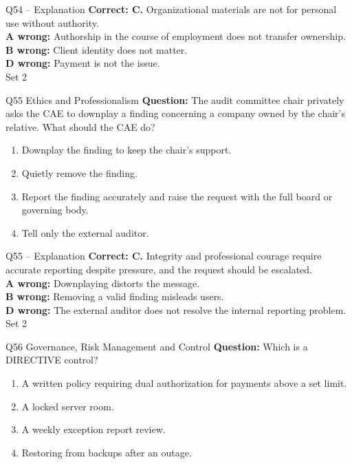 \documentclass[aspectratio=169,10pt]{beamer}
\begin{document}
\begin{frame}[t]{Q54 -- Explanation}
	\footnotesize
	\textbf{Correct: C.} Organizational materials are not for personal use without authority. \\[5pt]
\textbf{A wrong:} Authorship in the course of employment does not transfer ownership. \\[3pt]
\textbf{B wrong:} Client identity does not matter. \\[3pt]
\textbf{D wrong:} Payment is not the issue. \\[3pt]
	\vfill {\tiny Set 2}
\end{frame}

\begin{frame}[t]{Q55 \hfill {\scriptsize Ethics and Professionalism}}
	\small
	\textbf{Question:} The audit committee chair privately asks the CAE to downplay a finding concerning a company owned by the chair's relative. What should the CAE do?
	\begin{enumerate}[label=\Alph*.,itemsep=1pt,topsep=3pt]
			\item Downplay the finding to keep the chair's support.
			\item Quietly remove the finding.
			\item Report the finding accurately and raise the request with the full board or governing body.
			\item Tell only the external auditor.
	\end{enumerate}
\end{frame}

\begin{frame}[t]{Q55 -- Explanation}
	\footnotesize
	\textbf{Correct: C.} Integrity and professional courage require accurate reporting despite pressure, and the request should be escalated. \\[5pt]
\textbf{A wrong:} Downplaying distorts the message. \\[3pt]
\textbf{B wrong:} Removing a valid finding misleads users. \\[3pt]
\textbf{D wrong:} The external auditor does not resolve the internal reporting problem. \\[3pt]
	\vfill {\tiny Set 2}
\end{frame}

\begin{frame}[t]{Q56 \hfill {\scriptsize Governance, Risk Management and Control}}
	\small
	\textbf{Question:} Which is a DIRECTIVE control?
	\begin{enumerate}[label=\Alph*.,itemsep=1pt,topsep=3pt]
			\item A written policy requiring dual authorization for payments above a set limit.
			\item A locked server room.
			\item A weekly exception report review.
			\item Restoring from backups after an outage.
	\end{enumerate}
\end{frame}
\end{document}
